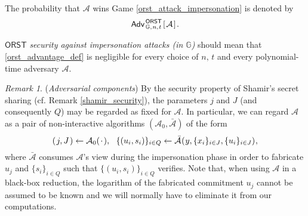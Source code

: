 \documentclass[10pt, psamsfonts, reqno]{amsart}
\theoremstyle{definition}
\theoremstyle{remark}
\newtheorem{rem}[thm]{Remark}
\numberwithin{equation}{section}
\begin{document}
\noindent
The probability that  $\mathcal{A}$ wins
Game \ref{orst_attack_impersonation}
is denoted by
\vspace{5pt}
\begin{equation}\label{orst_advantage_def}
\mathsf{Adv}
	_{\hspace{1pt}\mathbb{G},\hspace{0.5pt} n,\hspace{0.5pt} t}
	^{\hspace{1pt}\mathsf{ORST}}
	\hspace{1pt}
		[\hspace{1pt}
			\mathcal{A}
		\hspace{1pt}]\hspace{1pt}.
\vspace{5pt}
\end{equation}

\noindent
$\mathsf{ORST}$ \textit{security against impersonation attacks
\textup{(\textit{in} $\mathbb{G}$)}}
should mean that \eqref{orst_advantage_def}
is negligible for every choice of $n,\hspace{2pt} t$
and every polynomial-time adversary $\mathcal{A}$.

\begin{rem}\label{rem_adversarial_components}
(\textit{Adversarial components})
By the security property of
Shamir's secret sharing (cf. Remark \ref{shamir_security}),
the parameters $j$ and $J$ (and consequently $Q$)
may be regarded as fixed for $\mathcal{A}$.
In particular, we can regard $\mathcal{A}$ as
a pair of non-interactive algorithms
$(\mathcal{A}_0, \mathcal{\bar{A}})$
of the form
\vspace{5pt}
\begin{equation*}\label{adversary_internal}
(\hspace{1pt}j, J\hspace{1pt})
\leftarrow
\mathcal{A}_0(\hspace{1pt}\cdot\hspace{1pt}),\ \ \{(u_i, s_i)\}_{i \in Q} \leftarrow
\mathcal{\bar{A}}\hspace{0.5pt}
	(
		\hspace{0.5pt}
		y,
		\{x_i\}_{i \in J},
		\{u_i\}_{i \in J}
	)
\hspace{0.5pt},
\vspace{5pt}
\end{equation*}
where $\mathcal{\bar{A}}$ consumes $\mathcal{A}$'s view
during the impersonation phase
in order to fabricate $u_j$ and
$\{s_i\}_{i \in Q}$ such that
$\{(u_i, s_i)\}_{i \in Q}$ verifies.
Note that, when using $\mathcal{A}$
in a black-box reduction,
the logarithm of the fabricated commitment $u_j$
cannot be assumed to be known
and we will normally have to
eliminate it from our computations.
\end{rem}
\end{document}
